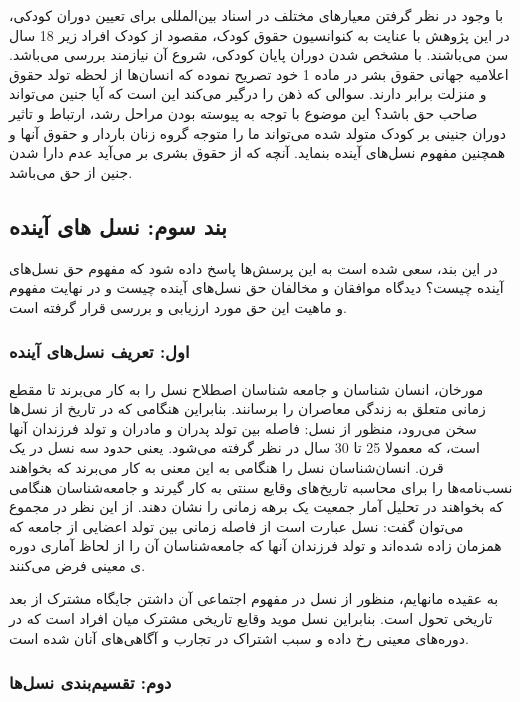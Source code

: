 با وجود در نظر گرفتن معیار‌های مختلف در اسناد بین‌المللی برای تعیین دوران کودکی، در این پژوهش با عنایت به کنوانسیون حقوق کودک، مقصود از کودک افراد زیر 18 سال سن می‌باشند. با مشخص شدن دوران پایان کودکی، شروع آن نیازمند بررسی می‌باشد. اعلامیه جهانی حقوق بشر در ماده 1 خود تصریح نموده که انسان‌ها از لحظه تولد حقوق و منزلت برابر دارند. سوالی که ذهن را درگیر می‌کند این است که آیا جنین می‌تواند صاحب حق باشد؟ این موضوع با توجه به پیوسته بودن مراحل رشد، ارتباط و تاثیر دوران جنینی بر کودک متولد شده می‌تواند ما را متوجه گروه زنان باردار و حقوق آنها و همچنین مفهوم نسل‌های آینده بنماید. آنچه که از حقوق بشری بر می‌آید عدم دارا شدن جنین از حق می‌باشد. 

	\subsection*{بند سوم: نسل های آینده}
در این بند، سعی شده است به این پرسش‌ها پاسخ داده شود که مفهوم حق نسل‌های آینده چیست؟ دیدگاه موافقان و مخالفان حق نسل‌های آینده چیست  و در نهایت مفهوم و ماهیت این حق مورد ارزیابی و بررسی قرار گرفته است. 	
	
		\subsubsection*{ اول: تعریف نسل‌های آینده}
		مورخان، انسان شناسان و جامعه شناسان اصطلاح نسل را به کار می‌برند تا مقطع زمانی متعلق به زندگی معاصران را برسانند. بنابراین هنگامی که در تاریخ از نسل‌ها سخن می‌رود، منظور از نسل: فاصله بین تولد پدران و مادران و تولد فرزندان آنها است، که معمولا 25 تا 30 سال در نظر گرفته می‌شود. یعنی حدود سه نسل در یک قرن. انسان‌شناسان نسل را هنگامی به این معنی به کار می‌برند که بخواهند نسب‌نامه‌ها را برای محاسبه تاریخ‌های وقایع سنتی به کار گیرند و جامعه‌شناسان هنگامی که بخواهند در تحلیل آمار جمعیت یک برهه زمانی را نشان دهند. از این نظر در مجموع می‌توان گفت: نسل عبارت است از فاصله زمانی بین تولد اعضایی از جامعه که همزمان زاده شده‌اند و تولد فرزندان آنها که جامعه‌شناسان آن را از لحاظ آماری دوره ی معینی فرض می‌کنند.
		
		به عقیده مانهایم، منظور از نسل در مفهوم اجتماعی آن داشتن جایگاه مشترک از بعد تاریخی تحول است. بنابراین نسل موید وقایع تاریخی مشترک میان افراد است که در دوره‌های معینی رخ داده و سبب اشتراک در تجارب و آگاهی‌های آنان شده است.
		
		\subsubsection*{ دوم: تقسیم‌بندی نسل‌ها}
		
